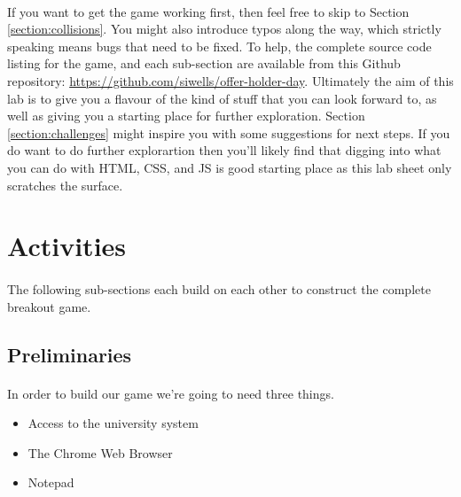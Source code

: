 \documentclass[10pt, a4paper, oneside]{article}
\begin{document}
\paragraph{} If you want to get the game working first, then feel free to skip to Section \ref{section:collisions}. You might also introduce typos along the way, which strictly speaking means bugs that need to be fixed. To help, the complete source code listing for the game, and each sub-section are available from this Github repository: \url{https://github.com/siwells/offer-holder-day}. Ultimately the aim of this lab is to give you a flavour of the kind of stuff that you can look forward to, as well as giving you a starting place for further exploration. Section \ref{section:challenges} might inspire you with some suggestions for next steps. If you do want to do further explorartion then you'll likely find that digging into what you can do with HTML, CSS, and JS is  good starting place as this lab sheet only scratches the surface.




\paragraph{} 


\section{Activities}

\paragraph{} The following sub-sections each build on each other to construct the complete breakout game.

\subsection{Preliminaries}

\paragraph{} In order to build our game we're going to need three things. 

\begin{itemize}
\item Access to the university system
\item The Chrome Web Browser
\item Notepad
\end{itemize}
\end{document}
